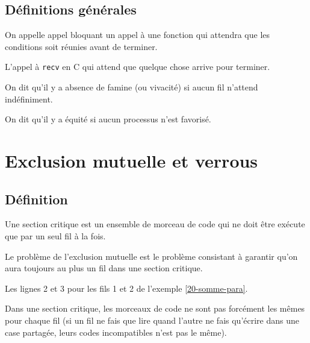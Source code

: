 \subsection{Définitions générales}

\begin{definition}
	On appelle appel bloquant un appel à une fonction qui attendra que les conditions soit réunies avant de terminer.
\end{definition}

\begin{example}
	L'appel à \texttt{recv} en C qui attend que quelque chose arrive pour terminer.
\end{example}

\begin{definition}
	On dit qu'il y a absence de famine (ou vivacité) si aucun fil n'attend indéfiniment.
\end{definition}

\begin{definition}
	On dit qu'il y a équité si aucun processus n'est favorisé.
\end{definition}

\section{Exclusion mutuelle et verrous}

\subsection{Définition}

\begin{definition}
	Une section critique est un ensemble de morceau de code qui ne doit être exécute que par un seul fil à la fois.
	
	Le problème de l'exclusion mutuelle est le problème consistant à garantir qu'on aura toujours au plus un fil dans une section critique.
\end{definition}

\begin{example}
	Les lignes 2 et 3 pour les fils 1 et 2 de l'exemple \ref{20-somme-para}.
\end{example}

\begin{rem}
	Dans une section critique, les morceaux de code ne sont pas forcément les mêmes pour chaque fil (si un fil ne fais que lire quand l'autre ne fais qu'écrire dans une case partagée, leurs codes incompatibles n'est pas le même).
\end{rem}

